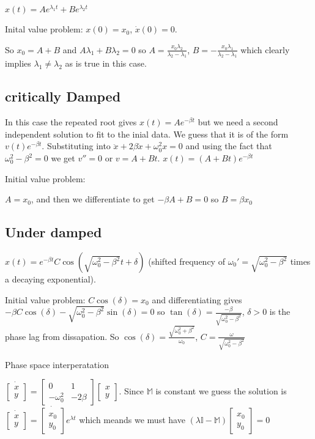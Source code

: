 \documentclass{homework}
\newcommand{\MM}{\mathbb{M}}
\newcommand{\m}[1]{\begin{bmatrix} #1 \end{bmatrix}}
\begin{document}
$x(t) = Ae^{\lambda_1 t} + Be^{\lambda_2 t}$

Inital value problem: $x(0) = x_0$, $\dot x(0) = 0$.

So $x_0 = A + B$ and $A \lambda_1 + B \lambda_2 = 0$ so $A = \frac{x_0 \lambda_2}{\lambda_2 - \lambda_1}$, $B = -\frac{x_0 \lambda_1}{\lambda_2 - \lambda_1}$ which clearly implies $\lambda_1 \neq \lambda_2$ as is true in this case.



\subsection{critically Damped}
In this case the repeated root gives $x(t) = Ae^{-\beta t}$ but we need a second independent solution to fit to the inial data. We guess that it is of the form $v(t)e^{-\beta t}$. Substituting into $\ddot x + 2\beta \dot x + \omega_0^2 x = 0$ and using the fact that $\omega_0^2 - \beta^2 = 0$ we get $v'' = 0$ or $v = A + Bt$. 
$x(t) = (A+Bt)e^{-\beta t}$


Initial value problem:

$A = x_0$, and then we differentiate to get $-\beta A + B = 0$ so $B = \beta x_0$

\subsection{Under damped}
$x(t) = e^{-\beta t}C \cos(\sqrt{\omega_0^2 - \beta^2}t + \delta)$ (shifted frequency of $\omega_0'  = \sqrt{\omega_0^2 - \beta^2}$ times a decaying exponential).


Initial value problem: $C\cos(\delta) = x_0$ and differentiating gives $-\beta C \cos (\delta) - \sqrt{\omega_0^2 - \beta^2}\sin (\delta) =0$ so $\tan(\delta) = \frac{-\beta}{\sqrt{\omega_0^2 - \beta^2}}$, $\delta >0$ is the phase lag from dissapation. So $\cos (\delta) = \frac{\sqrt{\omega_0^2 + \beta^2}}{\omega_0}$, $C = \frac{\omega}{\sqrt{\omega_0^2 - \beta^2}}$



Phase space interperatation

$\dot{\m{x \\ y}} = \m{0 & 1 \\ -\omega_0^2 & -2\beta} \m{x \\ y}$. Since $\MM$ is constant we guess the solution is $\dot{\m{x \\ y}} = \dot{\m{x_0 \\ y_0}}e^{\lambda t}$ which meands we must have $(\lambda \mathbb{I} - \mathbb{M})\m{x_0 \\ y_0} = 0$
\end{document}
